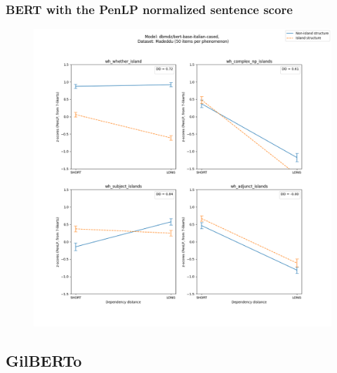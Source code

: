 \clearpage
\subsubsection{BERT with the PenLP normalized sentence score}
\begin{figure}[h]
	\centering
	\includegraphics[width=1\textwidth]{images/AppendixA/Madeddu_wh_dbmdz_bert-base-italian-cased_PenLP-zscores-likert-2022-09-17_h11m09s51.png} 
	\label{A-fig:md_bert2b_penlp}
	\caption{}
\end{figure}

\clearpage
\subsection{GilBERTo}
